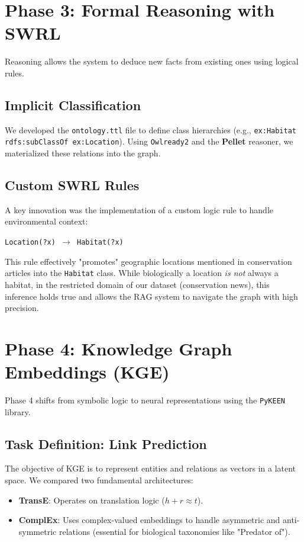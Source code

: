 \documentclass[11pt]{article}
\begin{document}
\section{Phase 3: Formal Reasoning with SWRL}
Reasoning allows the system to deduce new facts from existing ones using logical rules.

\subsection{Implicit Classification}
We developed the \texttt{ontology.ttl} file to define class hierarchies (e.g., \texttt{ex:Habitat rdfs:subClassOf ex:Location}). Using \texttt{Owlready2} and the \textbf{Pellet} reasoner, we materialized these relations into the graph.

\subsection{Custom SWRL Rules}
A key innovation was the implementation of a custom logic rule to handle environmental context:
\begin{center}
\texttt{Location(?x) $\rightarrow$ Habitat(?x)}
\end{center}
This rule effectively "promotes" geographic locations mentioned in conservation articles into the \texttt{Habitat} class. While biologically a location \textit{is not} always a habitat, in the restricted domain of our dataset (conservation news), this inference holds true and allows the RAG system to navigate the graph with high precision.

\section{Phase 4: Knowledge Graph Embeddings (KGE)}
Phase 4 shifts from symbolic logic to neural representations using the \texttt{PyKEEN} library.

\subsection{Task Definition: Link Prediction}
The objective of KGE is to represent entities and relations as vectors in a latent space. We compared two fundamental architectures:
\begin{itemize}
    \item \textbf{TransE}: Operates on translation logic ($h + r \approx t$).
    \item \textbf{ComplEx}: Uses complex-valued embeddings to handle asymmetric and anti-symmetric relations (essential for biological taxonomies like "Predator of").
\end{itemize}
\end{document}
